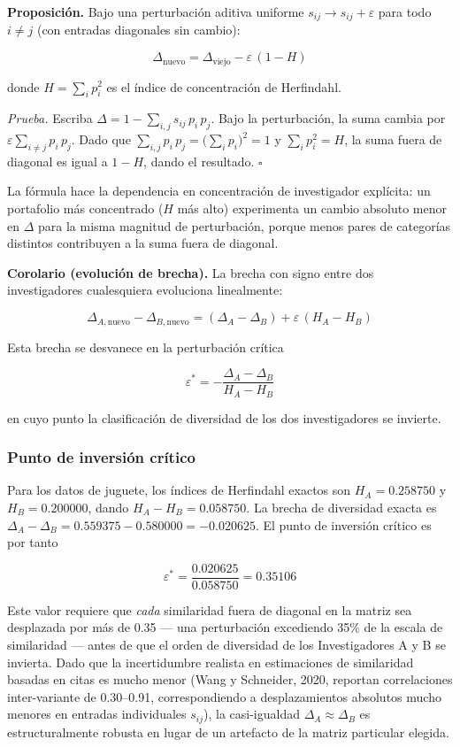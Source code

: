 \documentclass[
]{article}
\begin{document}
\textbf{Proposición.} Bajo una perturbación aditiva uniforme
\(s_{ij} \to s_{ij} + \varepsilon\) para todo \(i \neq j\) (con entradas
diagonales sin cambio):

\[\Delta_{\text{nuevo}} = \Delta_{\text{viejo}} - \varepsilon\,(1 - H)\]

donde \(H = \sum_i p_i^2\) es el índice de concentración de Herfindahl.

\emph{Prueba.} Escriba \(\Delta = 1 - \sum_{i,j} s_{ij}\,p_i\,p_j\).
Bajo la perturbación, la suma cambia por
\(\varepsilon \sum_{i \neq j} p_i\,p_j\). Dado que
\(\sum_{i,j} p_i\,p_j = \bigl(\sum_i p_i\bigr)^2 = 1\) y
\(\sum_i p_i^2 = H\), la suma fuera de diagonal es igual a \(1 - H\),
dando el resultado. \(\square\)

La fórmula hace la dependencia en concentración de investigador
explícita: un portafolio más concentrado (\(H\) más alto) experimenta un
cambio absoluto menor en \(\Delta\) para la misma magnitud de
perturbación, porque menos pares de categorías distintos contribuyen a
la suma fuera de diagonal.

\textbf{Corolario (evolución de brecha).} La brecha con signo entre dos
investigadores cualesquiera evoluciona linealmente:

\[\Delta_{A,\text{nuevo}} - \Delta_{B,\text{nuevo}} = (\Delta_A - \Delta_B)
  + \varepsilon\,(H_A - H_B)\]

Esta brecha se desvanece en la perturbación crítica

\[\varepsilon^* = -\frac{\Delta_A - \Delta_B}{H_A - H_B}\]

en cuyo punto la clasificación de diversidad de los dos investigadores
se invierte.

\hypertarget{punto-de-inversiuxf3n-cruxedtico}{%
\subsubsection{Punto de inversión
crítico}\label{punto-de-inversiuxf3n-cruxedtico}}

Para los datos de juguete, los índices de Herfindahl exactos son
\(H_A = 0.258750\) y \(H_B = 0.200000\), dando \(H_A - H_B = 0.058750\).
La brecha de diversidad exacta es
\(\Delta_A - \Delta_B = 0.559375 - 0.580000 = -0.020625\). El punto de
inversión crítico es por tanto

\[\varepsilon^* = \frac{0.020625}{0.058750} = 0.35106\]

Este valor requiere que \emph{cada} similaridad fuera de diagonal en la
matriz sea desplazada por más de 0.35 --- una perturbación excediendo
35\% de la escala de similaridad --- antes de que el orden de diversidad
de los Investigadores A y B se invierta. Dado que la incertidumbre
realista en estimaciones de similaridad basadas en citas es mucho menor
(Wang y Schneider, 2020, reportan correlaciones inter-variante de
0.30--0.91, correspondiendo a desplazamientos absolutos mucho menores en
entradas individuales \(s_{ij}\)), la casi-igualdad
\(\Delta_A \approx \Delta_B\) es estructuralmente robusta en lugar de un
artefacto de la matriz particular elegida.
\end{document}
